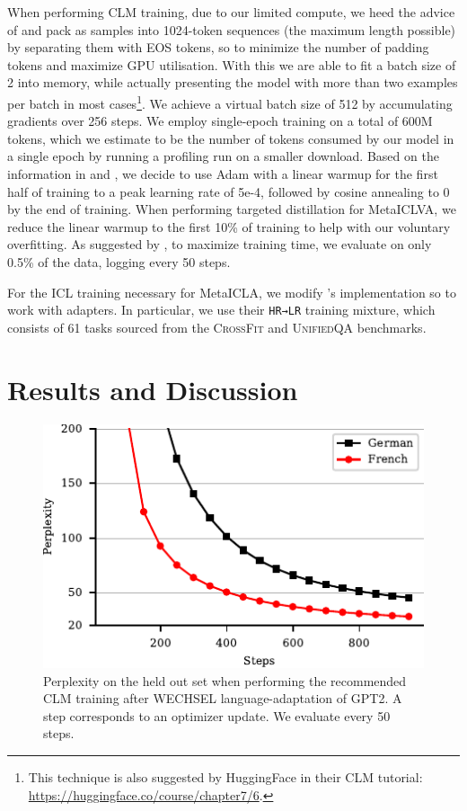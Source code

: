 \documentclass[11pt]{article}
\begin{document}
When performing CLM training, due to our limited compute, we heed the advice of
\citet{geiping_cramming_2022} and pack as samples into 1024-token sequences (the maximum length
possible) by separating them with EOS tokens, so to minimize the number of padding tokens and
maximize GPU utilisation. With this we are able to fit a batch size of 2 into memory, while actually
presenting the model with more than two examples per batch in most cases\footnote{This technique is
	also suggested by HuggingFace in their CLM tutorial:
	\href{https://huggingface.co/course/chapter7/6}{https://huggingface.co/course/chapter7/6}.}. We
achieve a virtual batch size of 512 by accumulating gradients over 256 steps. We employ single-epoch
training \citep{komatsuzaki_one_2019} on a total of 600M tokens, which we estimate to be the number
of tokens consumed by our model in a single epoch by running a profiling run on a smaller download.
Based on the information in \citet{geiping_cramming_2022} and \citet{minixhofer_wechsel_2022}, we
decide to use Adam \citep{kingma_adam_2015} with a linear warmup for the first half of training to
a peak learning rate of 5e-4, followed by cosine annealing to 0 by the end of training. When
performing targeted distillation for MetaICLVA, we reduce the linear warmup to the first 10\% of
training to help with our voluntary overfitting. As suggested by \citet{izsak_how_2021}, to maximize
training time, we evaluate on only 0.5\% of the data, logging every 50 steps.

For the ICL training necessary for MetaICLA, we modify \citet{min_metaicl_2022}'s implementation so
to work with adapters. In particular, we use their \verb+HR→LR+ training mixture, which consists of
61 tasks sourced from the \textsc{CrossFit} \citep{ye_crossfit_2021} and \textsc{UnifiedQA}
\citep{khashabi_unifiedqa_2020} benchmarks.

\section{Results and Discussion}
\begin{figure}[t]
	\centering
	\includegraphics{gpt2-w_ppl.pdf}
	\caption{Perplexity on the held out set when performing the recommended CLM training after WECHSEL
		language-adaptation of GPT2. A step corresponds to an optimizer update. We evaluate every 50
		steps.}
	\label{fig:gpt2-w_ppl}
\end{figure}
\end{document}

